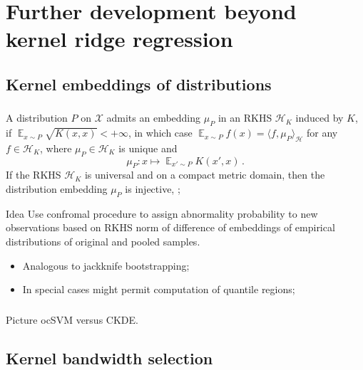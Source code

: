 \documentclass[t]{beamer}  %
\newcommand{\Xcal}{\mathcal{X}}
\newcommand{\Hcal}{\mathcal{H}}
\newcommand{\ex}{\mathop{\mathbb{E}}\nolimits}
\begin{document}

\section{Further development beyond kernel ridge regression} %
\label{sec:further_development_beyond_krr}

\subsection{Kernel embeddings of distributions} %
\label{sub:kernel_embeddings_of_distributions}

\begin{frame}[c]\frametitle{\insertsection}
  \framesubtitle{\insertsubsection}
    A distribution $P$ on $\Xcal$ admits an embedding $\mu_P$ in an RKHS $\Hcal_K$
    induced by $K$, if $\ex_{x\sim P} \sqrt{K(x,x)} < +\infty$, in which case
    $\ex_{x\sim P} f(x) = \langle f, \mu_P \rangle_\Hcal $ for any $f\in \Hcal_K$,
    where $\mu_P\in \Hcal_K$ is unique and
    $$ \mu_P: x \mapsto \ex_{x'\sim P} K(x', x) \,. $$
    If the RKHS $\Hcal_K$ is universal and on a compact metric domain, then the
    distribution embedding $\mu_P$ is injective, \cite{gretton2012};

    \begin{block}{Idea}
    Use confromal procedure to assign abnormality probability to new observations
    based on RKHS norm of difference of embeddings of empirical distributions of
    original and pooled samples.
    \begin{itemize}
      \item Analogous to jackknife bootstrapping;
      \item In special cases might permit computation of quantile regions;
    \end{itemize}
    \end{block}
\end{frame}

\begin{frame}[c]\frametitle{\insertsection}
  \framesubtitle{\insertsubsection}
      Picture ocSVM versus CKDE.
\end{frame}


\subsection{Kernel bandwidth selection} %
\label{sub:kernel_bandwidth_selection}
\end{document}
